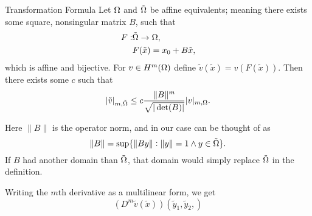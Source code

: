 \begin{thmx}{Transformation Formula\label{thm:transformation}}
    Let $\Omega$ and $\tilde{\Omega}$ be affine equivalents; meaning 
    there exists some square, nonsingular matrix $B$, such that 
    \begin{align*}
        F:&\tilde{\Omega}\to \Omega, \\
        & F(\tilde{x}) = x_0 + B\tilde{x},
    \end{align*}
    which is affine and bijective. For $v\in H^m(\Omega)$ define 
    $\tilde{v}(\tilde{x}) = v(F(\tilde{x}))$.
    Then there exists some $c$ such that 
    \begin{equation*}
        |\tilde{v}|_{m,\tilde{\Omega}} \leq 
        c \frac{\|B\|^m }{\sqrt{|\det(B)|}}|v|_{m,\Omega}.
    \end{equation*}
\end{thmx}
Here $\|B\|$ is the operator norm, and in our case can be thought of 
as 
\begin{equation*}
    \|B\| = \sup\{ \| By\| :\|y\| = 1 \land y \in \tilde{\Omega} \}.
\end{equation*}
If $B$ had another domain than $\tilde{\Omega}$, that domain would simply 
replace $\tilde{\Omega}$ in the definition.
\begin{bev}
   Writing the $m$th derivative as a multilinear form, we get 
   \begin{equation*}
    (D^m\tilde{v}(\tilde{x}))(\tilde{y}_1, \tilde{y}_2, )
   \end{equation*} 
\end{bev}